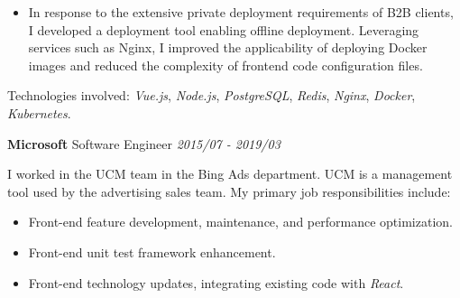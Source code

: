 \documentclass[a4paper]{article}
\newenvironment{changemargin}[2]{%
  \begin{list}{}{%
    \setlength{\topsep}{0pt}%
    \setlength{\leftmargin}{#1}%
    \setlength{\rightmargin}{#2}%
    \setlength{\listparindent}{\parindent}%
    \setlength{\itemindent}{\parindent}%
    \setlength{\parsep}{\parskip}%
  }%
  \item[]}{\end{list}
}
\newenvironment{body} {
	\vspace*{-16pt}
	\begin{changemargin}{-0.5in}{-0.5in}
  }
	{\end{changemargin}
}
\begin{document}
\begin{body}
	\vspace*{-8pt}
	\begin{itemize} \itemsep -0pt  %
		\item \begin{justify} In response to the extensive private deployment requirements of B2B clients, I developed a deployment tool enabling offline deployment. Leveraging services such as Nginx, I improved the applicability of deploying Docker images and reduced the complexity of frontend code configuration files. \end{justify} 
	\end{itemize}

	Technologies involved: \emph{Vue.js}, \emph{Node.js}, \emph{PostgreSQL}, \emph{Redis}, \emph{Nginx}, \emph{Docker}, \emph{Kubernetes}.

	\medskip

	\textbf{Microsoft} \hfill Software Engineer \emph{2015/07 - 2019/03} \\

	\begin{justify}
		I worked in the UCM team in the Bing Ads department. UCM is a management tool used by the advertising sales team. My primary job responsibilities include:
	\end{justify} 

	\smallskip

	\vspace*{-8pt}
	\begin{itemize} \itemsep -0pt  %
		\item \begin{justify} 
			Front-end feature development, maintenance, and performance optimization.
		\end{justify} 
	\end{itemize}

	\vspace*{-8pt}
	\begin{itemize} \itemsep -0pt  %
		\item \begin{justify}
			Front-end unit test framework enhancement.
		\end{justify}
	\end{itemize}

	\vspace*{-8pt}
	\begin{itemize} \itemsep -0pt  %
		\item \begin{justify}
			Front-end technology updates, integrating existing code with \emph{React}.
		\end{justify} 
	\end{itemize}


\end{body}
\end{document}
